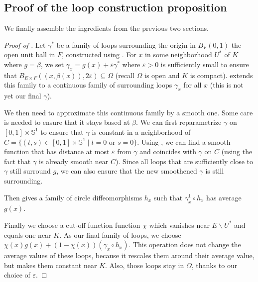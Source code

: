 \documentclass[10pt,a4paper]{article}
\newcommand{\uses}[1]{}
\newcommand{\proves}[1]{}
\newcommand{\leanok}{}
\begin{document}
\subsection{Proof of the loop construction proposition}
\label{sub:proof_of_the_loop_construction_proposition}

We finally assemble the ingredients from the previous two sections.

\begin{proof}[Proof of ]
  \proves{prop:∃_loops}
  \uses{lem:∃_surrounding_loops, lem:reparametrization, lem:exists_cont_diff_of_convex}
  \leanok
  Let $γ^*$ be a family of loops surrounding the origin in $B_F(0,1)$
  the open unit ball in $F$, constructed using .
  For $x$ in some neighborhood $U^*$ of $K$ where $g = β$, we set
  $γ_x = g(x) + εγ^*$ where $ε > 0$ is sufficiently small to ensure that
  $B_{E\times F}((x,β(x)),2ε)\subseteq \Omega$ (recall $Ω$ is
  open and $K$ is compact).
   extends this family to a continuous
  family of surrounding loops $γ_x$ for all $x$ (this is not yet our
  final $γ$).

  We then need to approximate this continuous family by a smooth one.
  Some care is needed to ensure that it stays based at $β$.
  We can first reparametrize $γ$ on $[0,1] \times 𝕊^1$
  to ensure that $γ$ is constant in a neighborhood of
  $C = \{(t, s) \in [0,1] \times 𝕊^1 \mid t = 0 \text{ or } s = 0\}$.
  Using , we can find a smooth function
  that has distance at most $ε$ from $γ$ and coincides with $γ$ on $C$
  (using the fact that $γ$ is already smooth near $C$).
  Since all loops that are sufficiently close to $γ$ still surround $g$,
  we can also ensure that the new smoothened $γ$ is still surrounding.

  Then  gives a family of circle
  diffeomorphisms $h_x$ such that $γ^1_x ∘ h_x$ has average $g(x)$.

  Finally we choose a cut-off function function $χ$ which vanishes near
  $E ∖ U^*$ and equals one near $K$. As our final family of loops,
  we choose $χ(x)g(x) + (1-χ(x))(γ_x ∘ h_x)$. This
  operation does not change the average values of these loops, because
  it rescales them around their average value, but makes them constant
  near $K$. Also, those loops stay in $Ω$, thanks to our choice of $ε$.
\end{proof}

\end{document}
